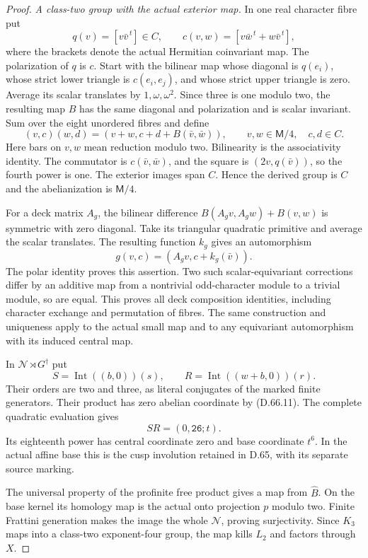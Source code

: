 \begin{proof}
\emph{A class-two group with the actual exterior map.}
In one real character fibre put
\[
 q(v)=[v\bar v^{\,t}]\in C,\qquad
 c(v,w)=[v\bar w^{\,t}+w\bar v^{\,t}],
 \tag{D.66.12}
\]
where the brackets denote the actual Hermitian coinvariant
map. The polarization of \(q\) is \(c\). Start with the
bilinear map whose diagonal is \(q(e_i)\), whose strict
lower triangle is \(c(e_i,e_j)\), and whose strict upper
triangle is zero. Average its scalar translates by
\(1,\omega,\omega^2\). Since three is one modulo two,
the resulting map \(B\) has the same diagonal and
polarization and is scalar invariant. Sum over the eight
unordered fibres and define
\[
 (v,c)(w,d)=(v+w,c+d+B(\bar v,\bar w)),\qquad
 v,w\in\mathsf M/4,\quad c,d\in C.
 \tag{D.66.13}
\]
Here bars on \(v,w\) mean reduction modulo two.
Bilinearity is the associativity identity. The commutator
is \(c(\bar v,\bar w)\), and the square is
\((2v,q(\bar v))\), so the fourth power is one.
The exterior images span \(C\). Hence the derived group
is \(C\) and the abelianization is \(\mathsf M/4\).

For a deck matrix \(A_g\), the bilinear difference
\(B(A_gv,A_gw)+B(v,w)\) is symmetric with zero diagonal.
Take its triangular quadratic primitive and average
the scalar translates. The resulting function \(k_g\)
gives an automorphism
\[
                     g(v,c)=(A_gv,c+k_g(\bar v)).
 \tag{D.66.14}
\]
The polar identity proves this assertion. Two such
scalar-equivariant corrections differ by an additive
map from a nontrivial odd-character module to a trivial
module, so are equal. This proves all deck composition
identities, including character exchange and permutation
of fibres. The same construction and uniqueness apply
to the actual small map and to any equivariant
automorphism with its induced central map.

In \(\mathscr N\rtimes G^\dagger\) put
\[
 S=\operatorname{Int}((b,0))(s),\qquad
 R=\operatorname{Int}((w+b,0))(r).
 \tag{D.66.15}
\]
Their orders are two and three, as literal conjugates
of the marked finite generators. Their product has
zero abelian coordinate by (D.66.11). The complete
quadratic evaluation gives
\[
                         SR=(0,\mathtt{26};t).
 \tag{D.66.16}
\]
Its eighteenth power has central coordinate zero and
base coordinate \(t^6\). In the actual affine base
this is the cusp involution retained in D.65, with its
separate source marking.

The universal property of the profinite free product
gives a map from \(\widehat B\). On the base kernel
its homology map is the actual onto projection \(p\)
modulo two. Finite Frattini generation makes the image
the whole \(\mathscr N\), proving surjectivity.
Since \(K_3\) maps into a class-two exponent-four
group, the map kills \(L_2\) and factors through \(X\).


\end{proof}
